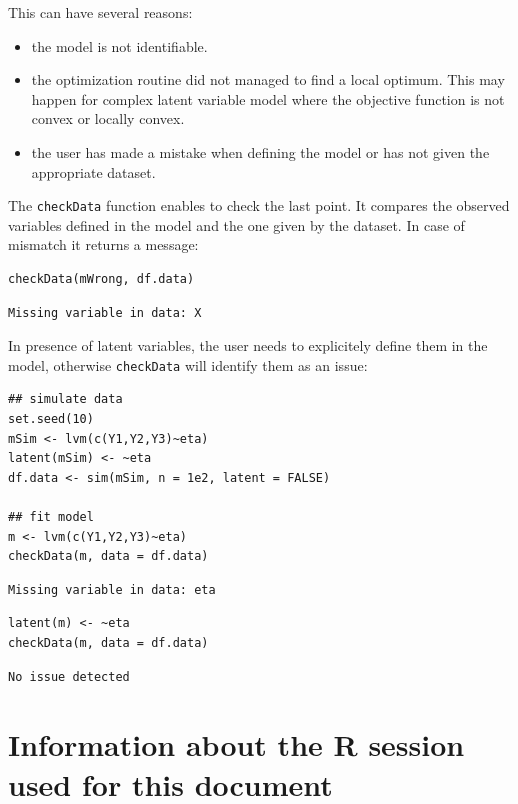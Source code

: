 \documentclass[12pt]{article}
\begin{document}
This can have several reasons:
\begin{itemize}
\item the model is not identifiable.
\item the optimization routine did not managed to find a local
optimum. This may happen for complex latent variable model where the
objective function is not convex or locally convex.
\item the user has made a mistake when defining the model or has not given
the appropriate dataset.
\end{itemize}

The \texttt{checkData} function enables to check the last point. It compares
the observed variables defined in the model and the one given by the
dataset. In case of mismatch it returns a message:
\lstset{language=r,label= ,caption= ,captionpos=b,numbers=none}
\begin{lstlisting}
checkData(mWrong, df.data)
\end{lstlisting}

\begin{verbatim}
Missing variable in data: X
\end{verbatim}


In presence of latent variables, the user needs to explicitely define
them in the model, otherwise \texttt{checkData} will identify them as an
issue:
\lstset{language=r,label= ,caption= ,captionpos=b,numbers=none}
\begin{lstlisting}
## simulate data
set.seed(10)
mSim <- lvm(c(Y1,Y2,Y3)~eta)
latent(mSim) <- ~eta
df.data <- sim(mSim, n = 1e2, latent = FALSE)

## fit model
m <- lvm(c(Y1,Y2,Y3)~eta)
checkData(m, data = df.data)
\end{lstlisting}

\begin{verbatim}
Missing variable in data: eta
\end{verbatim}


\lstset{language=r,label= ,caption= ,captionpos=b,numbers=none}
\begin{lstlisting}
latent(m) <- ~eta
checkData(m, data = df.data)
\end{lstlisting}

\begin{verbatim}
No issue detected
\end{verbatim}



\clearpage

\section{Information about the R session used for this document}
\label{sec:org602755b}
\end{document}
